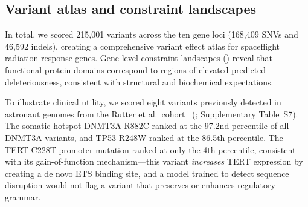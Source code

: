 \subsection{Variant atlas and constraint landscapes}
\label{sec:results_atlas}

In total, we scored 215,001 variants across the ten gene loci (168,409 SNVs and
46,592 indels), creating a comprehensive variant effect atlas for spaceflight
radiation-response genes. Gene-level constraint landscapes ()
reveal that functional protein domains correspond to regions of elevated predicted
deleteriousness, consistent with structural and biochemical expectations.

To illustrate clinical utility, we scored eight variants previously detected in
astronaut genomes from the Rutter et al.\ cohort~\cite{Rutter_2024}
(; Supplementary Table~S7). The somatic hotspot DNMT3A
R882C ranked at the 97.2nd percentile of all DNMT3A variants, and TP53 R248W
ranked at the 86.5th percentile. The TERT C228T promoter mutation ranked at only
the 4th percentile, consistent with its gain-of-function mechanism---this variant
\textit{increases} TERT expression by creating a de novo ETS binding site, and a
model trained to detect sequence disruption would not flag a variant that
preserves or enhances regulatory grammar.
